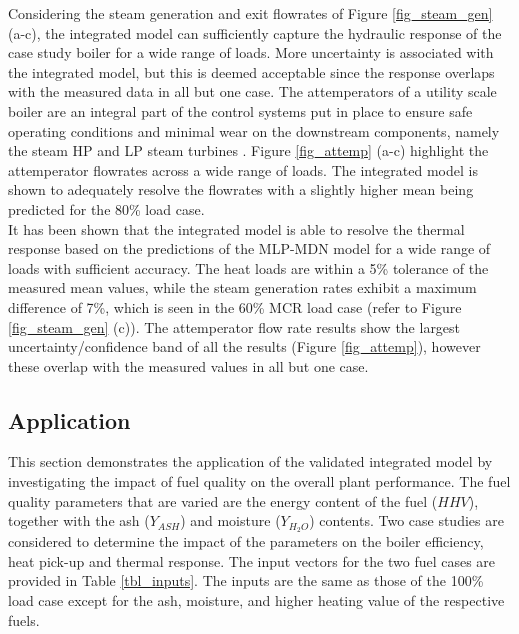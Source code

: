 \documentclass[a4paper,fleqn]{cas-dc}
\begin{document}
Considering the steam generation and exit flowrates of Figure \ref{fig_steam_gen} (a-c), the integrated model can sufficiently capture the hydraulic response of the case study boiler for a wide range of loads. More uncertainty is associated with the integrated model, but this is deemed acceptable since the response overlaps with the measured data in all but one case. The attemperators of a utility scale boiler are an integral part of the control systems put in place to ensure safe operating conditions and minimal wear on the downstream components, namely the steam HP and LP steam turbines \cite{Kakac1991}. Figure  \ref{fig_attemp} (a-c) highlight the attemperator flowrates across a wide range of loads. The integrated model is shown to adequately resolve the flowrates with a slightly higher mean being predicted for the 80\% load case.\\

It has been shown that the integrated model is able to resolve the thermal response based on the predictions of the MLP-MDN model for a wide range of loads with sufficient accuracy. The heat loads are within a 5\% tolerance of the measured mean values, while the steam generation rates exhibit a maximum difference of 7\%, which is seen in the 60\% MCR load case (refer to Figure \ref{fig_steam_gen} (c)). The attemperator flow rate results show the largest uncertainty/confidence band of all the results (Figure \ref{fig_attemp}), however these overlap with the measured values in all but one case. 
\subsection{Application}
This section demonstrates the application of the validated integrated model by investigating the impact of fuel quality on the overall plant performance. The fuel quality parameters that are varied are the energy content of the fuel ($HHV$), together with the ash ($Y_{ASH}$) and moisture ($Y_{H_{2}O}$) contents. Two case studies are considered to determine the impact of the parameters on the boiler efficiency, heat pick-up and thermal response. The input vectors for the two fuel cases are provided in Table \ref{tbl_inputs}. The inputs are the same as those of the 100\% load case except for the ash, moisture, and higher heating value of the respective fuels.\\
\end{document}

